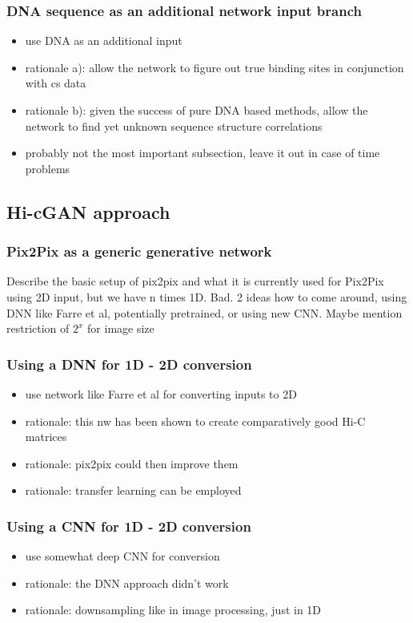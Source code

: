 \subsubsection{DNA sequence as an additional network input branch}
\begin{itemize}
 \item use DNA as an additional input
 \item rationale a): allow the network to figure out true binding sites in conjunction with cs data
 \item rationale b): given the success of pure DNA based methods, allow the network to find yet unknown sequence structure correlations
 \item probably not the most important subsection, leave it out in case of time problems
\end{itemize}

\subsection{Hi-cGAN approach} \label{sec:hi-cGAN}
\subsubsection{Pix2Pix as a generic generative network}
Describe the basic setup of pix2pix and what it is currently used for
Pix2Pix using 2D input, but we have n times 1D. Bad. 2 ideas how to come around,
using DNN like Farre et al, potentially pretrained, or using new CNN. Maybe mention restriction of $2^x$ for image size
\subsubsection{Using a DNN for 1D - 2D conversion}
\begin{itemize}
\item use network like Farre et al for converting inputs to 2D
\item rationale: this nw has been shown to create comparatively good Hi-C matrices 
\item rationale: pix2pix could then improve them
\item rationale: transfer learning can be employed
\end{itemize}

\subsubsection{Using a CNN for 1D - 2D conversion}
\begin{itemize}
 \item use somewhat deep CNN for conversion
 \item rationale: the DNN approach didn't work
 \item rationale: downsampling like in image processing, just in 1D
\end{itemize}















